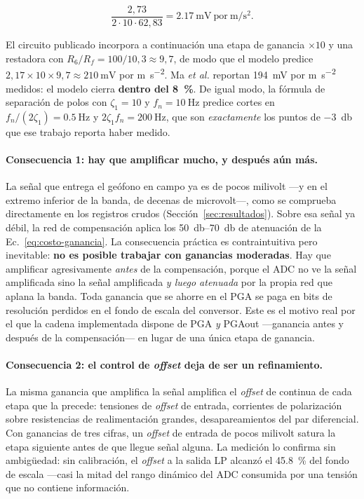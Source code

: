 \begin{equation*}
\frac{2{,}73}{2\cdot 10\cdot 62{,}83}=\SI{2.17}{\milli\volt}\ \text{por}\
\si{\meter\per\second\squared}.
\end{equation*}

El circuito publicado incorpora a continuaci\'on una etapa de ganancia $\times 10$ y una
restadora con $R_6/R_f=100/10{,}3\approx 9{,}7$, de modo que el modelo predice
$2{,}17\times 10\times 9{,}7\approx\SI{210}{\milli\volt}$ por
\si{\meter\per\second\squared}. Ma \emph{et al.} reportan \SI{194}{\milli\volt} por
\si{\meter\per\second\squared} medidos: el modelo cierra \textbf{dentro del
\SI{8}{\percent}}. De igual modo, la f\'ormula de separaci\'on de polos con $\zeta_1=10$ y
$f_n=\SI{10}{\hertz}$ predice cortes en $f_n/(2\zeta_1)=\SI{0.5}{\hertz}$ y
$2\zeta_1 f_n=\SI{200}{\hertz}$, que son \emph{exactamente} los puntos de
\SI{-3}{\decibel} que ese trabajo reporta haber medido.

\paragraph{Consecuencia 1: hay que amplificar mucho, y despu\'es a\'un m\'as.} La se\~nal
que entrega el ge\'ofono en campo ya es de pocos milivolt ---y en el extremo inferior de
la banda, de decenas de microvolt---, como se comprueba directamente en los registros
crudos (Secci\'on~\ref{sec:resultados}). Sobre esa se\~nal ya d\'ebil, la red de
compensaci\'on aplica los \SIrange{50}{70}{\decibel} de atenuaci\'on de la
Ec.~\eqref{eq:costo-ganancia}. La consecuencia pr\'actica es contraintuitiva pero
inevitable: \textbf{no es posible trabajar con ganancias moderadas}. Hay que amplificar
agresivamente \emph{antes} de la compensaci\'on, porque el ADC no ve la se\~nal
amplificada sino la se\~nal amplificada \emph{y luego atenuada} por la propia red que
aplana la banda. Toda ganancia que se ahorre en el PGA se paga en bits de resoluci\'on
perdidos en el fondo de escala del conversor. Este es el motivo real por el que la cadena
implementada dispone de PGA \emph{y} PGAout ---ganancia antes y despu\'es de la
compensaci\'on--- en lugar de una \'unica etapa de ganancia.

\paragraph{Consecuencia 2: el control de \emph{offset} deja de ser un refinamiento.} La
misma ganancia que amplifica la se\~nal amplifica el \emph{offset} de continua de cada
etapa que la precede: tensiones de \emph{offset} de entrada, corrientes de polarizaci\'on
sobre resistencias de realimentaci\'on grandes, desapareamientos del par diferencial. Con
ganancias de tres cifras, un \emph{offset} de entrada de pocos milivolt satura la etapa
siguiente antes de que llegue se\~nal alguna. La medici\'on lo confirma sin ambig\"uedad:
sin calibraci\'on, el \emph{offset} a la salida LP alcanz\'o el \SI{45.8}{\percent} del
fondo de escala ---casi la mitad del rango din\'amico del ADC consumida por una tensi\'on
que no contiene informaci\'on.

